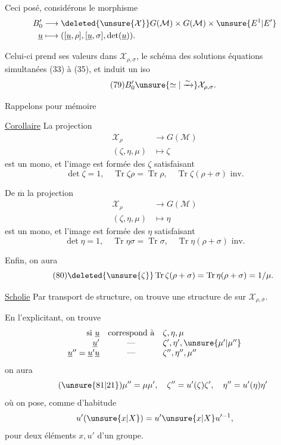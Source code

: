 Ceci posé, considérons le morphisme
\[
\begin{aligned}
B'_0&\longrightarrow\deleted{\unsure{\mathcal X}}G(\mathcal M)\times G(\mathcal M)\times\unsure{E^1|E'}\\
\underline u&\longmapsto([\underline u,\rho],[\underline u,\sigma],\det(\underline u)).
\end{aligned}
\]


Celui-ci prend ses valeurs dans $\mathcal X_{\rho,\sigma}$, le schéma des solutions  équations simultanées (33) à (35), et induit un iso
\[
\tag{79}B'_0\unsure{\simeq|\xrightarrow{\sim}}\mathcal X_{\rho,\sigma}.
\]

 Rappelons  pour mémoire

\uline{Corollaire} La projection
\[
\begin{aligned}
\mathcal X_\rho&\longrightarrow G(\mathcal M)\\
(\zeta,\eta,\mu)&\longmapsto\zeta
\end{aligned}
\]
est un mono, et l'image est formée des $\zeta$ satisfaisant
\[
\det\zeta=1,\quad \operatorname{Tr}\zeta\rho=\operatorname{Tr}\rho,\quad \operatorname{Tr}\zeta(\rho+\sigma)\text{ inv.}
\]

De $\overline{\mathrm m}$ la projection
\[
\begin{aligned}
\mathcal X_\rho&\longrightarrow G(\mathcal M)\\
(\zeta,\eta,\mu)&\longmapsto\eta
\end{aligned}
\]
est un mono, et l'image est formée des $\eta$ satisfaisant
\[
\det\eta=1,\quad\operatorname{Tr}\eta\sigma=\operatorname{Tr}\sigma,\quad\operatorname{Tr}\eta(\rho+\sigma)\text{ inv.}
\]

Enfin, on aura
\[
\tag{80}\deleted{\unsure{\zeta}}\operatorname{Tr}\zeta(\rho+\sigma)=\operatorname{Tr}\eta(\rho+\sigma)=1/\mu.
\]

\uline{Scholie} Par transport de structure, on trouve une structure de  sur $\mathcal X_{\rho,\sigma}$.


En l'explicitant, on trouve
\[
\begin{array}{rcl}
\text{si }\underline u&\text{correspond à}&\zeta,\eta,\mu\\
\underline u'&\text{---}&\zeta',\eta',\unsure{\mu'|\mu''}\\
\underline u''=\underline u'\underline u&\text{---}&\zeta'',\eta'',\mu''
\end{array}
\]
on aura
\[
\tag{\unsure{81|21}}\mu''=\mu\mu',\quad\zeta''=u'(\zeta)\zeta',\quad\eta''=u'(\eta)\eta'
\]
où on pose, comme d'habitude
\[
u'(\unsure{x|X})=u'\unsure{x|X}u'^{-1},
\]
pour deux éléments $x,u'$ d'un groupe.

